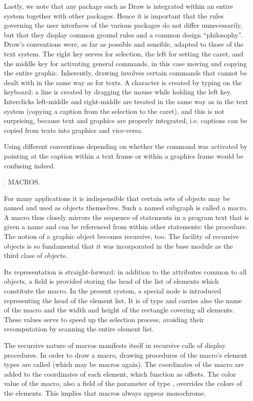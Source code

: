 Lastly, we note that any package such as Draw is integrated within an entire system together with other packages. Hence it is important that the rules governing the user interfaces of the various packages do not differ unnecessarily, but that they display common ground rules and a common design ``philosophy''. Draw's conventions were, as far as possible and sensible, adapted to those of the text system. The right key serves for selection, the left for setting the caret, and the middle key for activating general commands, in this case moving and copying the entire graphic. Inherently, drawing involves certain commands that cannot be dealt with in the same way as for texts. A character is created by typing on the keyboard; a line is created by dragging the mouse while holding the left key. Interclicks left-middle and right-middle are treated in the same way as in the text system (copying a caption from the selection to the caret), and this is not surprising, because text and graphics are properly integrated, i.e. captions can be copied from texts into graphics and vice-versa.

Using different conventions depending on whether the command was activated by pointing at the caption within a text frame or within a graphics frame would be confusing indeed.

. MACROS.

For many applications it is indispensible that certain sets of objects may be named and used as objects themselves. Such a named subgraph is called a macro. A macro thus closely mirrors the sequence of statements in a program text that is given a name and can be referenced from within other statements: the procedure. The notion of a graphic object becomes recursive, too. The facility of recursive objects is so fundamental that it was incorporated in the base module  as the third class of objects.

Its representation is straight-forward: in addition to the attributes common to all objects, a field is provided storing the head of the list of elements which constitute the macro. In the present system, a special node is introduced representing the head of the element list. It is of type  and carries also the name of the macro and the width and height of the rectangle covering all elements. These values serve to speed up the selection process, avoiding their recomputation by scanning the entire element list.

The recursive nature of macros manifests itself in recursive calls of display procedures. In order to draw a macro, drawing procedures of the macro's element types are called (which may be macros again). The coordinates of the macro are added to the coordinates of each element, which function as offsets. The color value of the macro, also a field of the parameter of type , overrides the colors of the elements. This implies that macros always appear monochrome.

